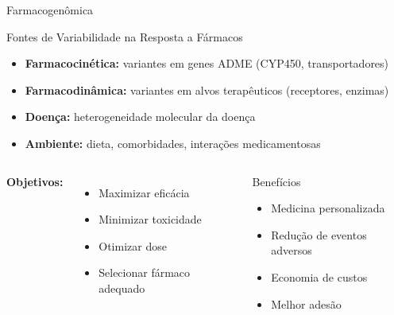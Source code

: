 \begin{frame}{Farmacogenômica}

\vspace{0.3cm}

\begin{block}{Fontes de Variabilidade na Resposta a Fármacos}
\begin{itemize}
    \item \textbf{Farmacocinética:} variantes em genes ADME (CYP450, transportadores)
    \item \textbf{Farmacodinâmica:} variantes em alvos terapêuticos (receptores, enzimas)
    \item \textbf{Doença:} heterogeneidade molecular da doença
    \item \textbf{Ambiente:} dieta, comorbidades, interações medicamentosas
\end{itemize}
\end{block}

\vspace{0.3cm}

\begin{columns}
\textbf{Objetivos:}
\begin{itemize}
    \item Maximizar eficácia
    \item Minimizar toxicidade
    \item Otimizar dose
    \item Selecionar fármaco adequado
\end{itemize}

\begin{exampleblock}{Benefícios}
\begin{itemize}
    \item Medicina personalizada
    \item Redução de eventos adversos
    \item Economia de custos
    \item Melhor adesão
\end{itemize}
\end{exampleblock}
\end{columns}
\end{frame}

